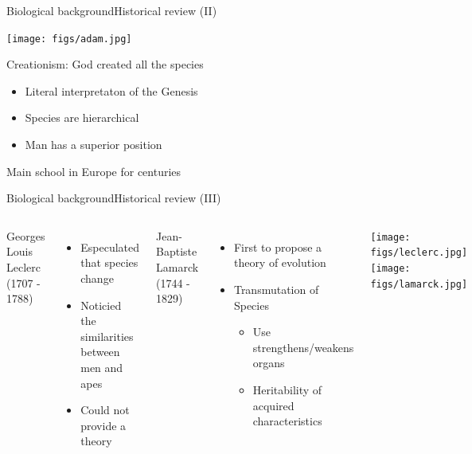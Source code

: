 \documentclass[10pt,compress]{beamer} %
\begin{document}
\begin{frame}{Biological background}{Historical review (II)}
	\vspace{-0.2cm}
	\begin{center}\texttt{[image: figs/adam.jpg]}\\
	\end{center}
	   Creationism: God created all the species
 	 	\begin{itemize}
		\item Literal interpretaton of the Genesis
		\item Species are hierarchical
		\item Man has a superior position
		\end{itemize}
		Main school in Europe for centuries
\end{frame}

\begin{frame}{Biological background}{Historical review (III)}
 	\begin{columns}
		Georges Louis Leclerc (1707 - 1788)

 	 	\begin{itemize}
		\item Especulated that species change
		\item Noticied the similarities between men and apes
		\item Could not provide a theory
		\end{itemize}

		Jean-Baptiste Lamarck (1744 - 1829)
		\begin{itemize}
		\item First to propose a theory of evolution
		\item Transmutation of Species
		    \begin{itemize}
		        \item Use strengthens/weakens organs
		        \item Heritability of acquired characteristics
		    \end{itemize}
		\end{itemize}

		\centering\texttt{[image: figs/leclerc.jpg]}\\
		\centering\texttt{[image: figs/lamarck.jpg]}
	\end{columns}
\end{frame}
\end{document}
